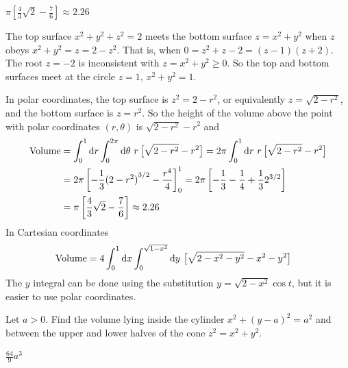 \begin{answer}
$\pi \left[\frac{4}{3}\sqrt{2}-\frac{7}{6}\right] 
\approx 2.26$
\end{answer}

\begin{solution}
The top surface $x^2+y^2+z^2=2$ meets the bottom surface
$z=x^2+y^2$ when $z$ obeys $x^2+y^2=z=2-z^2$. That is, when 
$0=z^2+z-2=(z-1)(z+2)$. The root $z=-2$ is inconsistent with 
$z=x^2+y^2\ge 0$. So the top and bottom surfaces meet at the circle
$z=1$, $x^2+y^2=1$.

In polar coordinates, the top surface is $z^2=2-r^2$, or equivalently
$z=\sqrt{2-r^2}$, and the bottom surface is $z=r^2$. So the height of the volume
above the point with polar coordinates $(r,\theta)$ is
$\sqrt{2-r^2}-r^2$ and
\begin{align*}
\text{Volume}&=\int_0^1\dee{r}\int_0^{2\pi} \dee{\theta}\ r\,\big[\sqrt{2-r^2}-r^2\big]
=2\pi \int_0^1\dee{r}\ r\,\big[\sqrt{2-r^2}-r^2\big]\\
&=2\pi \left[-\frac{1}{3}{(2-r^2)}^{3/2}-\frac{r^4}{4}\right]_0^1
=2\pi \left[-\frac{1}{3}-\frac{1}{4}+\frac{1}{3}2^{3/2}\right] \\
&=\pi \left[\frac{4}{3}\sqrt{2}-\frac{7}{6}\right] 
\approx 2.26
\end{align*}
In Cartesian coordinates
\begin{align*}
\text{Volume}&=4\int_0^1\dee{x}\int_0^{\sqrt{1-x^2}} \dee{y}\ 
                       \big[\sqrt{2-x^2-y^2}-x^2-y^2\big]
\end{align*}
The $y$ integral can be done using the substitution $y=\sqrt{2-x^2}\cos t$,
but it is easier to use polar coordinates.
\end{solution}

\begin{question}
Let $a>0$.
Find the volume lying inside the cylinder $x^2+(y-a)^2=a^2$ 
and between the upper and lower halves of the cone $z^2=x^2+y^2$.
\end{question}

%

\begin{answer}
$\frac{64}{9}a^3$
\end{answer}

